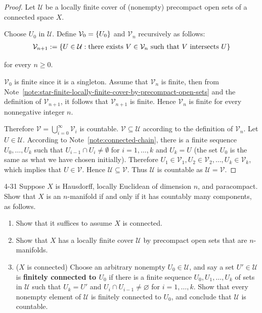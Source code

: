 \begin{proof}
	Let $\mathcal{U}$ be a locally finite cover of (nonempty) precompact open sets of a connected space $X$.

	Choose $U_{0}$ in $\mathcal{U}$. Define $\mathcal{V}_{0} = \left\{{ U_{0} }\right\}$ and $\mathcal{V}_{n}$ recursively as follows:
	\begin{align*}
		\mathcal{V}_{n+1} := \left\{{ U\in\mathcal{U}: \text{there exists $V \in \mathcal{V}_{n}$ such that $V$ intersects $U$} }\right\}
	\end{align*}

	for every $n\geq 0$.

	$\mathcal{V}_{0}$ is finite since it is a singleton. Assume that $\mathcal{V}_{n}$ is finite, then from Note~\ref{note:star-finite-locally-finite-cover-by-precompact-open-sets} and the definition of $\mathcal{V}_{n+1}$, it follows that $\mathcal{V}_{n+1}$ is finite. Hence $\mathcal{V}_{n}$ is finite for every nonnegative integer $n$.

	Therefore $\mathcal{V} = \bigcup^{\infty}_{i=0}\mathcal{V}_{i}$ is countable. $\mathcal{V} \subseteq \mathcal{U}$ according to the definition of $\mathcal{V}_{n}$. Let $U\in \mathcal{U}$. According to Note~\ref{note:connected-chain}, there is a finite sequence $U_{0}, \ldots, U_{k}$ such that $U_{i-1}\cap U_{i}\ne \emptyset$ for $i = 1, \ldots, k$ and $U_{k} = U$ (the set $U_{0}$ is the same as what we have chosen initially). Therefore $U_{1} \in \mathcal{V}_{1}, U_{2} \in \mathcal{V}_{2}, \ldots, U_{k} \in \mathcal{V}_{k}$, which implies that $U\in \mathcal{V}$. Hence $\mathcal{U} \subseteq \mathcal{V}$. Thus $\mathcal{U}$ is countable as $\mathcal{U} = \mathcal{V}$.
\end{proof}

\begin{problem}{4-31}
Suppose $X$ is Hausdorff, locally Euclidean of dimension $n$, and paracompact. Show that $X$ is an $n$-manifold if and only if it has countably many components, as follows.
\begin{enumerate}[label={(\alph*)},itemsep=0pt]
	\item Show that it suffices to assume $X$ is connected.
	\item Show that $X$ has a locally finite cover $\mathscr{U}$ by precompact open sets that are $n$-manifolds.
	\item ($X$ is connected) Choose an arbitrary nonempty $U_{0} \in \mathscr{U}$, and say a set $U' \in \mathscr{U}$ is \textbf{finitely connected to $U_{0}$} if there is a finite sequence $U_{0}, U_{1}, \ldots, U_{k}$ of sets in $\mathscr{U}$ such that $U_{k} = U'$ and $U_{i} \cap U_{i-1} \ne \varnothing$ for $i = 1, \ldots, k$. Show that every nonempty element of $\mathscr{U}$ is finitely connected to $U_{0}$, and conclude that $\mathscr{U}$ is countable.
\end{enumerate}
\end{problem}

